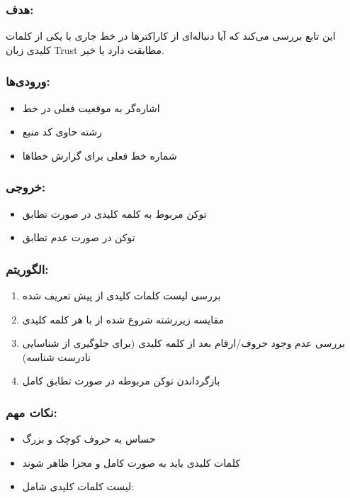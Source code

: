 \documentclass[12pt, a4paper]{report}
\begin{document}
\subsubsection*{هدف:}
این تابع بررسی می‌کند که آیا دنباله‌ای از کاراکترها در خط جاری با یکی از کلمات کلیدی زبان Trust مطابقت دارد یا خیر.

\subsubsection*{ورودی‌ها:}
\begin{itemize}
\item {} اشاره‌گر به موقعیت فعلی در خط
\item {} رشته حاوی کد منبع
\item {} شماره خط فعلی برای گزارش خطاها
\end{itemize}

\subsubsection*{خروجی:}
\begin{itemize}
\item توکن مربوط به کلمه کلیدی در صورت تطابق
\item توکن  در صورت عدم تطابق
\end{itemize}

\subsubsection*{الگوریتم:}
\begin{enumerate}
\item بررسی لیست کلمات کلیدی از پیش تعریف شده
\item مقایسه زیررشته شروع شده از  با هر کلمه کلیدی
\item بررسی عدم وجود حروف/ارقام بعد از کلمه کلیدی (برای جلوگیری از شناسایی نادرست شناسه)
\item بازگرداندن توکن مربوطه در صورت تطابق کامل
\end{enumerate}

\subsubsection*{نکات مهم:}
\begin{itemize}
\item حساس به حروف کوچک و بزرگ
\item کلمات کلیدی باید به صورت کامل و مجزا ظاهر شوند
\item لیست کلمات کلیدی شامل: 
\end{itemize}
\end{document}
